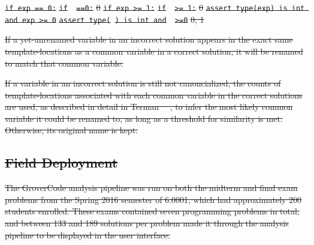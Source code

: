 \documentclass[12pt,twoside]{mitthesis}
\providecommand{\DIFdeltex}[1]{{\protect\color{red}\sout{#1}}}                      %
\providecommand{\DIFdelFL}[1]{\DIFdel{#1}} %
\providecommand{\DIFdel}[1]{\texorpdfstring{\DIFdeltex{#1}}{}} %
\begin{document}
{{{{{{{{{{%
\texttt{\DIFdelFL{if exp == 0:}} %
\texttt{\DIFdelFL{if }\underline{\DIFdelFL{\hspace{1em}}}%
\DIFdelFL{==0:}} %
\DIFdelFL{0 }%
\texttt{\DIFdelFL{if exp >= 1:}} %
\texttt{\DIFdelFL{if }\underline{\DIFdelFL{\hspace{1em}}} %
\DIFdelFL{>= 1:}} %
\DIFdelFL{0 }%
\texttt{\DIFdelFL{assert type(exp) is int and exp >= 0}} %
\texttt{\DIFdelFL{assert type(}\underline{\DIFdelFL{\hspace{1em}}}%
\DIFdelFL{) is int and }\underline{\DIFdelFL{\hspace{1em}}}%
\DIFdelFL{>=0}} %
\DIFdelFL{0, 1 }%

\DIFdel{If a yet-unrenamed variable in an incorrect solution appears in the exact same template-locations as a common variable in a correct solution, it will be renamed to match that common variable.
}%

\DIFdel{If a variable in an incorrect solution is still not canoncialized, the counts of template-locations associated with each common variable in the correct solutions are used, as described in detail in Terman~\mbox{%
\cite{staceythesis}}%
, to infer the most likely common variable it could be renamed to, as long as a threshold for similarity is met. Otherwise, its original name is kept. 
}%

\subsection{\DIFdel{Field Deployment}}
\addtocounter{subsection}{-1}%

\DIFdel{The GroverCode analysis pipeline was run on both the midterm and final exam problems from the Spring 2016 semester of 6.0001, which had approximately 200 students enrolled. These exams contained seven programming problems in total, and between 133 and 189 solutions per problem made it through the analysis pipeline to be displayed in the user interface. 
}%

}}}}}}}}}}
\end{document}
